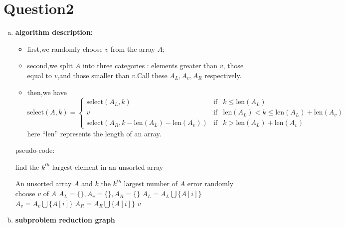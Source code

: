 \section{Question2}
\begin{enumerate}[a).]
\item  \textbf{algorithm description:}
\begin{itemize}
	\item first,we randomly choose $v$ from the array $A$;
	\item second,we split $A$ into three categories : elements greater than $v$,
	those equal to $v$,and those smaller than $v$.Call these $A_L,A_v,A_R$ respectively.
	\item then,we have 
	\begin{equation*}
	 \text{select}(A,k) = \left\lbrace 
	 \begin{array}{lll}
	 \text{select}(A_L,k) &\text{if}& k \leq  \text{len}(A_L)\\
	 v  &\text{if}& \text{len}(A_L) < k \leq \text{len}(A_L) + \text{len}(A_v)\\
	 \text{select}(A_R,k-\text{len}(A_L)-\text{len}(A_v)) &\text{if}& k > \text{len}(A_L) + \text{len}(A_v)
	 \end{array}
	 \right.
	\end{equation*}
	here ``len'' represents the length of an array.
\end{itemize}
pseudo-code:
\begin{algorithm}
\caption{find the $k^{th}$ largest element in an unsorted array}
\begin{algorithmic}[1]
\Require An unsorted array $A$ and $k$
\Ensure the $k^{th}$ largest number	of  $A$
\State \Return error
\EndIf
\State randomly choose $v$ of $A$
\State $A_L=\{\},A_v=\{\},A_R=\{\}$
\State $A_L = A_L \bigcup \{A[i]\} $
\State $A_v = A_v \bigcup \{A[i]\} $
\Else
\State $A_R = A_R \bigcup \{A[i]\} $
\EndIf
\EndFor
{}
\State \Return {}
\State \Return $v$ 
\Else
\State \Return {}
\EndIf
\EndFunction
\end{algorithmic}
\end{algorithm}
\item  \textbf{subproblem reduction graph}
\begin{figure}[H]
\centering

\end{figure}
\end{enumerate}
